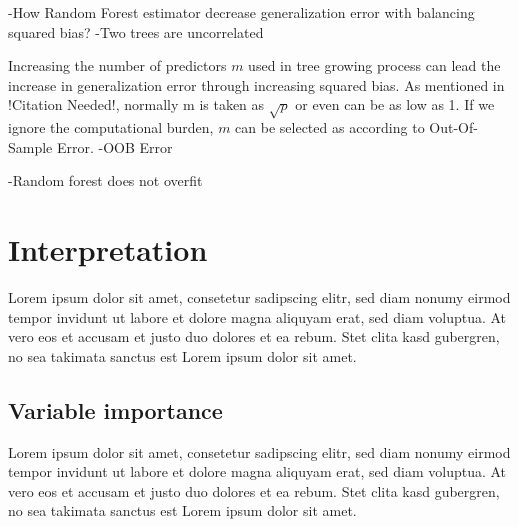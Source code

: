 -How Random Forest estimator decrease generalization error with balancing squared bias?
-Two trees are uncorrelated


Increasing the number of predictors $m$ used in tree growing process can lead the increase in generalization error through increasing squared bias. As mentioned in !Citation Needed!, normally m is taken as $\sqrt{p}$ or even can be as low as 1. If we ignore the computational burden, $m$ can be selected as according to Out-Of-Sample Error.
-OOB Error


-Random forest does not overfit





\section{Interpretation}
Lorem ipsum dolor sit amet, consetetur sadipscing elitr,
sed diam nonumy eirmod tempor invidunt ut labore et dolore magna aliquyam erat, sed diam voluptua.
At vero eos et accusam et justo duo dolores et ea rebum. Stet clita kasd gubergren,
no sea takimata sanctus est Lorem ipsum dolor sit amet.

\subsection{Variable importance}
Lorem ipsum dolor sit amet, consetetur sadipscing elitr,
sed diam nonumy eirmod tempor invidunt ut labore et dolore magna aliquyam erat, sed diam voluptua.
At vero eos et accusam et justo duo dolores et ea rebum. Stet clita kasd gubergren,
no sea takimata sanctus est Lorem ipsum dolor sit amet.

